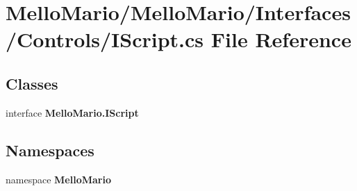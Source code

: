 \section{Mello\+Mario/\+Mello\+Mario/\+Interfaces/\+Controls/\+I\+Script.cs File Reference}
\label{IScript_8cs}
\subsection*{Classes}
\begin{DoxyCompactItemize}
\item 
interface \textbf{ Mello\+Mario.\+I\+Script}
\end{DoxyCompactItemize}
\subsection*{Namespaces}
\begin{DoxyCompactItemize}
\item 
namespace \textbf{ Mello\+Mario}
\end{DoxyCompactItemize}
